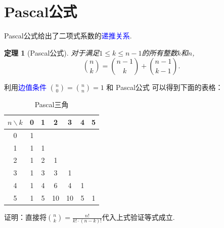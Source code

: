 \documentclass[punct]{ctexbeamer}
\newtheorem{thm}{定理}[section]
\newcommand{\blue}{\textcolor{blue}}
\begin{document}
\section{Pascal公式}

\begin{frame}



Pascal公式给出了二项式系数的\blue{递推关系}.
\begin{thm}[Pascal公式]

对于满足$1\leq k\leq n-1$的所有整数$k$和$n$,
\[
	\binom{n}{k}=\binom{n-1}{k}+\binom{n-1}{k-1}.
	\]
\end{thm}
%
%


利用\blue{边值条件}
${n \choose 0}={n \choose n}=1$  和 Pascal公式 可以得到下面的表格：
\begin{table}[]
    \begin{tabular}{c|cccccc}
        $n\backslash k$ & 0 & 1 & 2  & 3  & 4 & 5 \\ \hline
        0 & 1 &   &    &    &   &   \\
        1 & 1 & 1 &    &    &   &   \\
        2 & 1 & 2 & 1  &    &   &   \\
        3 & 1 & 3 & 3  & 1  &   &   \\
        4 & 1 & 4 & 6  & 4  & 1 &   \\
        5 & 1 & 5 & 10 & 10 & 5 & 1 \\
    \end{tabular}
\caption{Pascal三角}
\end{table}

\vspace{-10pt}


\pause
证明：直接将$\binom{n}{k}=\frac{n!}{k!\cdot(n-k)!}$代入上式验证等式成立.
\end{frame}
\end{document}
